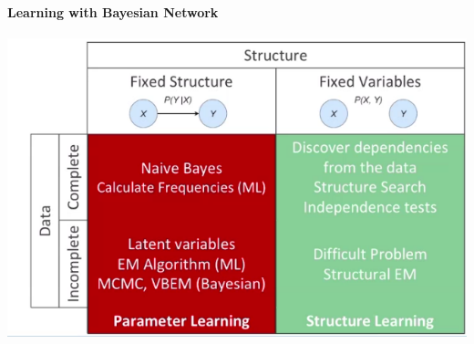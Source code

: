 \documentclass[10pt]{report}
\begin{document}
\paragraph{Learning with Bayesian Network}
\begin{center}
	\includegraphics[scale=0.5]{26.png}
\end{center}
\end{document}
